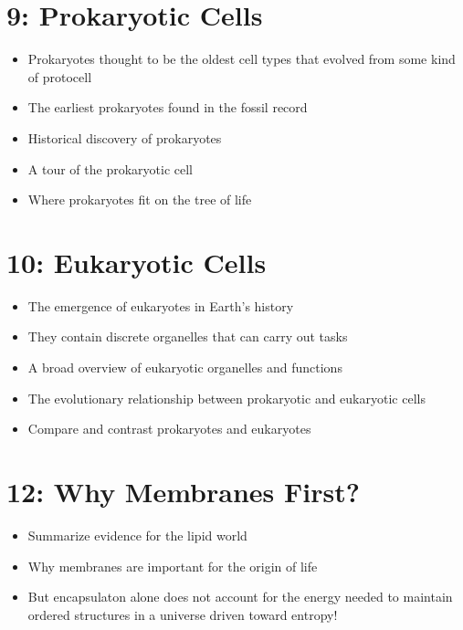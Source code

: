 \documentclass[
]{report}
\providecommand{\tightlist}{%
  \setlength{\itemsep}{0pt}\setlength{\parskip}{0pt}}
\providecommand{\tightlist}{%
  \setlength{\itemsep}{0pt}\setlength{\parskip}{0pt}}
\begin{document}
\hypertarget{prokaryotic-cells}{%
\section*{9: Prokaryotic Cells}\label{prokaryotic-cells}}

\begin{itemize}
\tightlist
\item
  Prokaryotes thought to be the oldest cell types that evolved from some kind of protocell
\item
  The earliest prokaryotes found in the fossil record
\item
  Historical discovery of prokaryotes
\item
  A tour of the prokaryotic cell
\item
  Where prokaryotes fit on the tree of life
\end{itemize}

\hypertarget{eukaryotic-cells}{%
\section*{10: Eukaryotic Cells}\label{eukaryotic-cells}}

\begin{itemize}
\tightlist
\item
  The emergence of eukaryotes in Earth's history
\item
  They contain discrete organelles that can carry out tasks
\item
  A broad overview of eukaryotic organelles and functions
\item
  The evolutionary relationship between prokaryotic and eukaryotic cells
\item
  Compare and contrast prokaryotes and eukaryotes
\end{itemize}

\hypertarget{why-membranes-first}{%
\section*{12: Why Membranes First?}\label{why-membranes-first}}

\begin{itemize}
\tightlist
\item
  Summarize evidence for the lipid world
\item
  Why membranes are important for the origin of life
\item
  But encapsulaton alone does not account for the energy needed to maintain ordered structures in a universe driven toward entropy!
\end{itemize}
\end{document}
